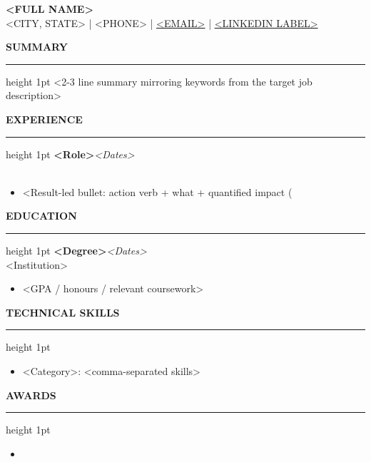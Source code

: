 \documentclass[10pt]{article}
\newcommand{\sectionrule}{\vspace{2pt}\hrule height 1pt\vspace{5pt}}
\newcommand{\resumesection}[1]{{\large\textbf{\MakeUppercase{#1}}}\sectionrule}
\newcommand{\jobtitle}[3]{\textbf{#1}\hfill \textit{#2}\\#3\\[2pt]}
\begin{document}
\vspace*{0pt}

\begin{center}
{\fontsize{20pt}{24pt}\selectfont\textbf{<FULL NAME>}}\\[6pt]
<CITY, STATE> \;|\; <PHONE> \;|\; \href{mailto:<EMAIL>}{<EMAIL>} \;|\; \href{<LINKEDIN URL>}{<LINKEDIN LABEL>}
\end{center}
\vspace{4pt}
\raggedright

\resumesection{Summary}
<2-3 line summary mirroring keywords from the target job description>

\vspace{6pt}
\resumesection{Experience}
\jobtitle{<Role>}{<Dates>}{<Company, City, State>}
\begin{itemize}
  \item <Result-led bullet: action verb + what + quantified impact (%
\end{itemize}

\vspace{6pt}
\resumesection{Education}
\jobtitle{<Degree>}{<Dates>}{<Institution>}
\begin{itemize}
  \item <GPA / honours / relevant coursework>
\end{itemize}

\vspace{6pt}
\resumesection{Technical Skills}
\begin{itemize}
  \item <Category>: <comma-separated skills>
\end{itemize}

\vspace{6pt}
\resumesection{Awards}
\begin{itemize}
  \item <Award, year>
\end{itemize}
\end{document}
